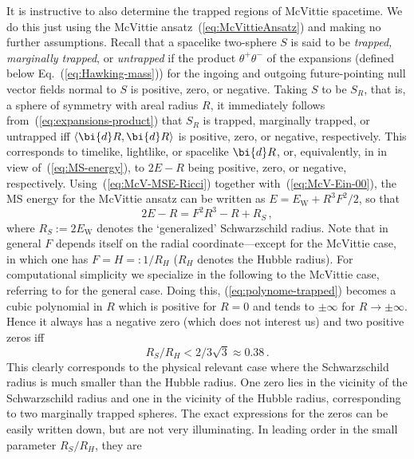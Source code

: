 \documentclass
[rmp,aps,twocolumn,showpacs,preprintnumbers,amsmath,amssymb]{revtex4}
\theoremstyle{plain}
\theoremstyle{definition}
\theoremstyle{remark}
\newcommand{\sss}{\scriptscriptstyle}
\newcommand{\ind}[1]{{\sss \text{#1}}}        %
\newcommand{\sprod}[2]{\langle#1,#2\rangle}   %
\newcommand{\ed}{\bi{d}}                      %
\begin{document}
It is instructive to also determine the trapped regions of McVittie 
spacetime. We do this just using the McVittie ansatz~(\ref{eq:McVittieAnsatz}) 
and making no further assumptions. Recall that a spacelike two-sphere $S$ 
is said to be \emph{trapped, marginally trapped}, or \emph{untrapped} if 
the product $\theta^+\theta^-$ of the expansions (defined below 
Eq.~(\ref{eq:Hawking-mass})) for the ingoing and outgoing future-pointing 
null vector fields normal to $S$  is positive, zero, or negative. Taking 
$S$ to be $S_R$, that is, a sphere of symmetry with areal radius $R$, it 
immediately follows from~(\ref{eq:expansions-product}) that $S_R$ is 
trapped, marginally trapped, or untrapped iff $\sprod{\ed R}{\ed R}$ is 
positive, zero, or negative, respectively. This corresponds to timelike, 
lightlike, or spacelike $\ed R$, or, equivalently, in in view 
of~(\ref{eq:MS-energy}), to $2E-R$ being positive, zero, or negative, 
respectively. Using~(\ref{eq:McV-MSE-Ricci}) together 
with~(\ref{eq:McV-Ein-00}), the MS energy for the McVittie ansatz can 
be written as $E = E_\ind{W} + R^3F^2/2$, so that 
%
\begin{equation}\label{eq:polynome-trapped}
  2E - R = F^2R^3 - R + R_S \,,
\end{equation}
%
where $R_S\!:=\!2E_\ind{W}$ denotes the `generalized' Schwarzschild radius. 
Note that in general $F$ depends itself on the radial coordinate---except 
for the McVittie case, in which one has $F=H=:1/R_H$ ($R_H$ denotes the 
Hubble radius). For computational simplicity we specialize in the following 
to the McVittie case, referring to \cite{Carrera.Giulini:2009a} for the 
general case. Doing this, (\ref{eq:polynome-trapped}) becomes a cubic 
polynomial in $R$ which is positive for $R=0$ and tends to $\pm\infty$ for 
$R\rightarrow\pm\infty$. Hence it always has a negative zero (which does 
not interest us) and two positive zeros iff 
%
\begin{equation}\label{eq:discrim-condition}
  R_S/R_H < 2/3\sqrt{3} \approx 0.38 \,.
\end{equation}
%
This clearly corresponds to the physical relevant case where the 
Schwarzschild radius is much smaller than the Hubble radius. One zero lies 
in the vicinity of the Schwarzschild radius and one in the vicinity of the 
Hubble radius, corresponding to two marginally trapped spheres. The exact 
expressions for the zeros can be easily written down, but are not very 
illuminating. In leading order in the small parameter $R_S/R_H$, they are 
\end{document}

